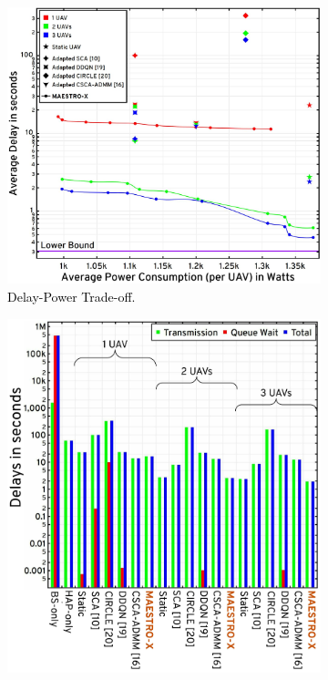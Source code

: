 \documentclass[12pt, draftcls, onecolumn]{IEEEtran}
\theoremstyle{plain}
\theoremstyle{definition}
\theoremstyle{remark}
\newcommand\hlt[1]{\textcolor{black}{#1}}
\begin{document}
\begin{figure} [t]
     \begin{subfigure}{0.55\linewidth}
         \centering
         \includegraphics[width=1.0\linewidth]{figs/Delay_Power_10Mb_Scatter_Low_Congestion.jpg}
         \caption{\hlt{Delay-Power Trade-off.}}
         \label{F8}
     \end{subfigure}
     \hfill
     \begin{subfigure}{0.433\linewidth}
         \centering
         \includegraphics[width=1.0\linewidth]{figs/Delay_Power_10Mb_Chart_Low_Congestion.jpeg}

\end{subfigure}
\end{figure}
\end{document}

